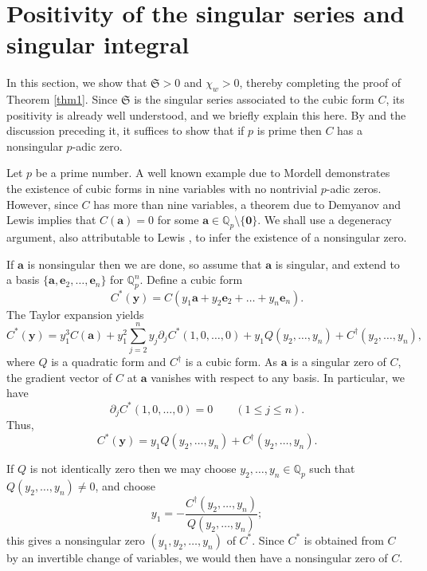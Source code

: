 \documentclass[12pt,reqno]{amsart}
\theoremstyle{definition}
\theoremstyle{remark}
\numberwithin{equation}{section}
\begin{document}
\section{Positivity of the singular series and singular integral}
\label{positivity}

In this section, we show that ${\mathfrak S} > 0$ and $\chi_w > 0$, thereby completing the proof of Theorem \ref{thm1}. Since ${\mathfrak S}$ is the singular series associated to the cubic form $C$, its positivity is already well understood, and we briefly explain this here. By \cite[Lemma 7.1]{Bir1962} and the discussion preceding it, it suffices to show that if $p$ is prime then $C$ has a nonsingular $p$-adic zero. 

Let $p$ be a prime number. A well known example due to Mordell \cite{Mor1937} demonstrates the existence of cubic forms in nine variables with no nontrivial $p$-adic zeros. However, since $C$ has more than nine variables, a theorem due to Demyanov \cite{Dem1950} and Lewis \cite{Lew1952} implies that $C({\mathbf a}) = 0$ for some ${\mathbf a} \in {\mathbb Q}_p \setminus \{ {\mathbf 0} \}$. We shall use a degeneracy argument, also attributable to Lewis \cite[p. 50]{Lew1969}, to infer the existence of a nonsingular zero.

If ${\mathbf a}$ is nonsingular then we are done, so assume that ${\mathbf a}$ is singular, and extend to a basis $\{ {\mathbf a}, {\mathbf e}_2, \ldots, {\mathbf e}_n \}$ for ${\mathbb Q}_p^n$. Define a cubic form
\[
C^*({\mathbf y}) = C(y_1 {\mathbf a} + y_2 {\mathbf e}_2 + \ldots + y_n {\mathbf e}_n).
\]
The Taylor expansion yields
\[
C^*({\mathbf y}) = y_1^3 C({\mathbf a}) + y_1 ^2 \sum_{j=2}^n y_j  \partial_j C^*(1, 0, \ldots, 0)
+ y_1 Q(y_2, \ldots, y_n) + C^{\dagger}(y_2, \ldots, y_n),
\]
where $Q$ is a quadratic form and $C^{\dagger}$ is a cubic form. As ${\mathbf a}$ is a singular zero of $C$, the gradient vector of $C$ at ${\mathbf a}$ vanishes with respect to any basis. In particular, we have
\[
\partial_j C^*(1, 0, \ldots, 0) = 0 \qquad (1 {\leqslant} j {\leqslant} n).
\]
Thus,
\[
C^*({\mathbf y}) = y_1 Q(y_2, \ldots, y_n) + C^{\dagger}(y_2, \ldots, y_n).
\]

If $Q$ is not identically zero then we may choose $y_2, \ldots, y_n \in {\mathbb Q}_p$ such that $Q(y_2, \ldots, y_n) \ne 0$, and choose
\[
y_1 = - \frac{ C^{\dagger}(y_2, \ldots, y_n) } {Q(y_2, \ldots, y_n)};
\]
this gives a nonsingular zero $(y_1, y_2, \ldots, y_n)$ of $C^*$. Since $C^*$ is obtained from $C$ by an invertible change of variables, we would then have a nonsingular zero of $C$.
\end{document}
